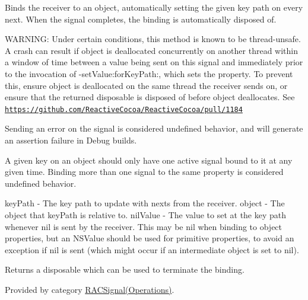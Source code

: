 Binds the receiver to an object, automatically setting the given key path on every {\ttfamily next}. When the signal completes, the binding is automatically disposed of.

W\+A\+R\+N\+I\+NG\+: Under certain conditions, this method is known to be thread-\/unsafe. A crash can result if {\ttfamily object} is deallocated concurrently on another thread within a window of time between a value being sent on this signal and immediately prior to the invocation of -\/set\+Value\+:for\+Key\+Path\+:, which sets the property. To prevent this, ensure {\ttfamily object} is deallocated on the same thread the receiver sends on, or ensure that the returned disposable is disposed of before {\ttfamily object} deallocates. See \href{https://github.com/ReactiveCocoa/ReactiveCocoa/pull/1184}{\tt https\+://github.\+com/\+Reactive\+Cocoa/\+Reactive\+Cocoa/pull/1184}

Sending an error on the signal is considered undefined behavior, and will generate an assertion failure in Debug builds.

A given key on an object should only have one active signal bound to it at any given time. Binding more than one signal to the same property is considered undefined behavior.

key\+Path -\/ The key path to update with {\ttfamily next}s from the receiver. object -\/ The object that {\ttfamily key\+Path} is relative to. nil\+Value -\/ The value to set at the key path whenever {\ttfamily nil} is sent by the receiver. This may be nil when binding to object properties, but an N\+S\+Value should be used for primitive properties, to avoid an exception if {\ttfamily nil} is sent (which might occur if an intermediate object is set to {\ttfamily nil}).

Returns a disposable which can be used to terminate the binding. 

Provided by category \mbox{\hyperlink{category_r_a_c_signal_07_operations_08_a3d59cca19be3e985aa5a08cb0386faeb}{R\+A\+C\+Signal(\+Operations)}}.

\mbox{\label{interface_r_a_c_signal_a3d59cca19be3e985aa5a08cb0386faeb}} 
